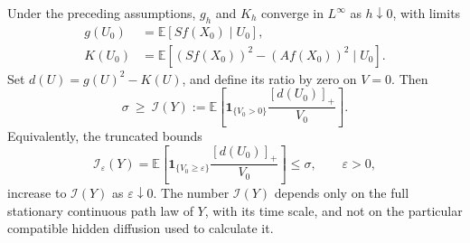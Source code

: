 \begin{theorem}
\label{thm:og-local}
Under the preceding assumptions, $g_h$ and $K_h$ converge in $L^\infty$
as $h\downarrow0$, with limits
\begin{align}
 g(U_0)&=\mathbb E[Sf(X_0)\mid U_0],\\
 K(U_0)&=\mathbb E[(Sf(X_0))^2-(Af(X_0))^2\mid U_0].
 \label{eq:og-conditional-limits}
\end{align}
Set $d(U)=g(U)^2-K(U)$, and define its ratio by zero on $V=0$. Then
\begin{equation}
 \boxed{\displaystyle
 \sigma\ \geq\ \mathcal I(Y)
 :=\mathbb E\!\left[
       \mathbf 1_{\{V_0>0\}}\frac{[d(U_0)]_+}{V_0}
                    \right].}
 \label{eq:og-local-bound}
\end{equation}
Equivalently, the truncated bounds
\[
 \mathcal I_\varepsilon(Y)
 =\mathbb E\!\left[
   \mathbf 1_{\{V_0\geq\varepsilon\}}
   \frac{[d(U_0)]_+}{V_0}\right]\leq\sigma,
 \qquad \varepsilon>0,
\]
increase to $\mathcal I(Y)$ as $\varepsilon\downarrow0$.
The number $\mathcal I(Y)$ depends only on the full stationary continuous
path law of $Y$, with its time scale, and not on the particular compatible
hidden diffusion used to calculate it.
\end{theorem}

